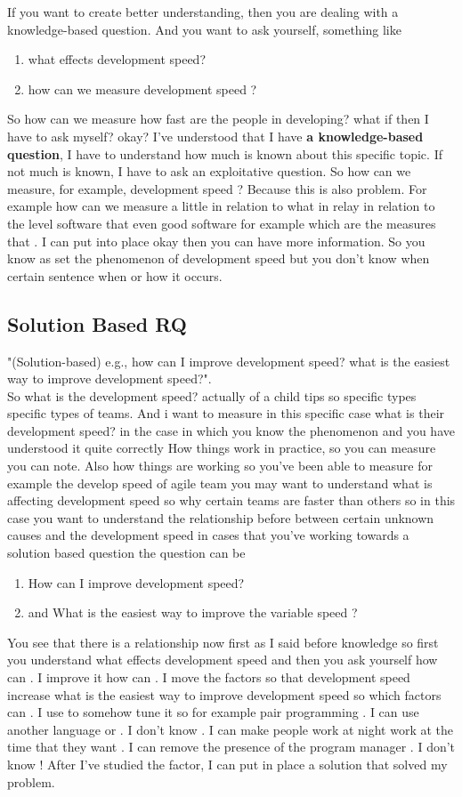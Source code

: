 \documentclass[conference, compsoc, twoside]{IEEEtran}
\begin{document}
If you want to create better understanding, then you are dealing with a knowledge-based question.
And you want to ask yourself, something like 
\begin{enumerate}
	\item what effects development speed? 
	\item how can we measure development speed ?
\end{enumerate}

So how can we measure how fast are the people in developing?
what if then I have to ask myself? okay? 
I've understood that I have \textbf{a knowledge-based question},
I have to understand how much is known about this specific topic.
If not much is known, I have to ask an exploitative question. 
So how can we measure, for example, development speed ?
Because this is also problem. 
For example how can we measure a little in relation to what in relay in relation to the level software that even good software for example which are the measures that .
I can put into place okay then you can have more information.
So you know as set the phenomenon of development speed but you don't know when certain sentence when or how it occurs. 

\subsection{Solution Based RQ} %
"(Solution-based) e.g., how can I improve development speed? what is the easiest way to improve development speed?".\\
So what is the development speed? actually of a child tips so specific types specific types of teams. 
And i want to measure in this specific case what is their development speed? 
in the case in which you know the phenomenon and you have understood it quite correctly
 How things work in practice, so you can measure you can note.
Also how things are working so you've been able to measure for example the develop speed of agile team you may want to understand what is affecting development speed so why certain teams are faster than others so in this case you want to understand the relationship before between certain unknown causes and the development speed in cases that you've working towards a solution based question the question can be 
\begin{enumerate}
	\item How can I improve development speed? 
	\item and What is the easiest way to improve the variable speed ?
\end{enumerate}  
 You see that there is a relationship now first as I said before knowledge so first you understand what effects development speed and then you ask yourself how can .
I improve it how can .
I move the factors so that development speed increase what is the easiest way to improve development speed so which factors can .
I use to somehow tune it so for example pair programming .
I can use another language or .
I don't know .
I can make people work at night work at the time that they want .
I can remove the presence of the program manager .
I don't know !
After I've studied the factor, I can put in place a solution that solved my problem.
\end{document}
